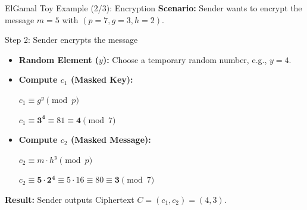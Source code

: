 \documentclass[aspectratio=169, 10pt]{beamer}
\begin{document}
\begin{frame}{ElGamal Toy Example (2/3): Encryption}
    \textbf{Scenario:} Sender wants to encrypt the message $m = 5$ with $(p=7, g=3, h=2)$.
    
    \vspace{0.3cm}
    \begin{block}{Step 2: Sender encrypts the message}
        \begin{itemize}
            \item \textbf{Random Element ($y$):} Choose a temporary random number, e.g., $y = 4$.
            \vspace{0.1cm}
            \item \textbf{Compute $c_1$ (Masked Key):} 
            \begin{center}
            $c_1 \equiv g^y \pmod p$
            \end{center}
            \begin{center}
                $c_1 \equiv \textbf{3}^{\textbf{4}} \equiv  81 \equiv \textbf{4} \pmod 7$
            \end{center}
            \vspace{0.2cm}
            \item \textbf{Compute $c_2$ (Masked Message):} 
            \begin{center}
            $c_2 \equiv m \cdot h^y \pmod p$
            \end{center}
            \begin{center}
                $c_2 \equiv \textbf{5} \cdot \textbf{2}^{\textbf{4}} \equiv  5 \cdot 16 \equiv  80 \equiv \textbf{3} \pmod 7$
            \end{center}
        \end{itemize}
    \end{block}
    
    \vspace{0.1cm}
    \textbf{Result:} Sender outputs Ciphertext $C = (c_1, c_2) = (4, 3)$.
\end{frame}
\end{document}
